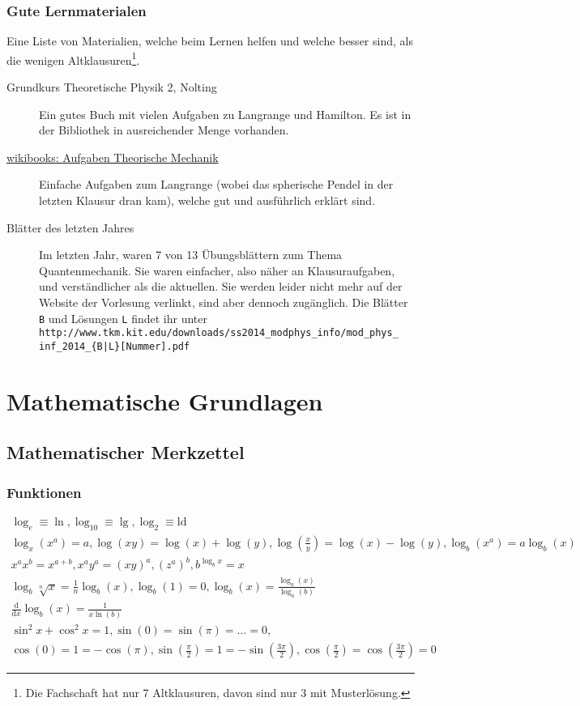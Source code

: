 \documentclass[oneside]{book}
\theoremstyle{definition}
\renewcommand{\d}{\mathrm d}
\begin{document}
\subsection{Gute Lernmaterialen}
Eine Liste von Materialien, welche beim Lernen helfen und welche besser sind, als die wenigen Altklausuren\footnote{Die Fachschaft hat nur 7 Altklausuren, davon sind nur 3 mit Musterlösung.}.

\begin{description}
	\item[Grundkurs Theoretische Physik 2, Nolting] Ein gutes Buch mit vielen Aufgaben zu Langrange und Hamilton. Es ist in der Bibliothek in ausreichender Menge vorhanden.
	\item[\href{https://de.wikibooks.org/wiki/Aufgabensammlung_Physik:_Theoretische_Mechanik}{wikibooks: Aufgaben Theorische Mechanik}] Einfache Aufgaben zum Langrange (wobei das spherische Pendel in der letzten Klausur dran kam), welche gut und ausführlich erklärt sind.
	\item[Blätter des letzten Jahres] Im letzten Jahr, waren 7 von 13 Übungsblättern zum Thema Quantenmechanik. Sie waren einfacher, also näher an Klausuraufgaben, und verständlicher als die aktuellen. Sie werden leider nicht mehr auf der Website der Vorlesung verlinkt, sind aber dennoch zugänglich. Die Blätter \verb|B| und Lösungen \verb|L| findet ihr unter\\ \verb-http://www.tkm.kit.edu/downloads/ss2014_modphys_info/mod_phys_- \verb-inf_2014_{B|L}[Nummer].pdf-
\end{description}

\chapter{Mathematische Grundlagen}

\section{Mathematischer Merkzettel}

\subsection{Funktionen}
\begin{eqnarray*}
\log_e \equiv \ln, \log_10 \equiv \lg, \log_2 \equiv \mathrm{ld}\\
\log_x(x^a) = a, \log(xy) = \log(x) + \log(y), \log(\frac{x}{y}) = \log(x) - \log(y), \log_b(x^a) = a \log_b(x)\\
x^a x^b = x^{a + b}, x^a y^a = (x y)^a, (z^a)^b, b^{\log_b x} = x\\
\log_b \sqrt[n]{x} = \frac{1}{n} \log_b(x), \log_b(1) = 0, \log_b(x) = \frac{\log_a(x)}{\log_a(b)}\\
\frac{\d}{\d x} \log_b (x) = \frac{1}{x \ln(b)}\\
\sin^2x + \cos^2 x = 1, \sin(0) = \sin(\pi) = \dots = 0, \\ \cos(0) = 1 = - \cos(\pi), \sin(\frac{\pi}{2}) = 1 = - \sin(\frac{3 \pi}{2}), \cos(\frac{\pi}{2}) = \cos(\frac{3 \pi}{2}) = 0
\end{eqnarray*}
\end{document}
